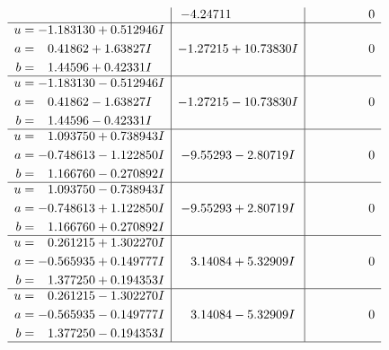 \documentclass[1p]{elsarticle_modified}
\theoremstyle{definition}
\begin{document}
$$\begin{array}{c|c|c}
 & -4.24711\phantom{ +0.000000I} & \phantom{-0.000000 } 0 \\ \hline\begin{aligned}
u &= -1.183130 + 0.512946 I \\
a &= \phantom{-}0.41862 + 1.63827 I \\
b &= \phantom{-}1.44596 + 0.42331 I\end{aligned}
 & -1.27215 + 10.73830 I & \phantom{-0.000000 } 0 \\ \hline\begin{aligned}
u &= -1.183130 - 0.512946 I \\
a &= \phantom{-}0.41862 - 1.63827 I \\
b &= \phantom{-}1.44596 - 0.42331 I\end{aligned}
 & -1.27215 - 10.73830 I & \phantom{-0.000000 } 0 \\ \hline\begin{aligned}
u &= \phantom{-}1.093750 + 0.738943 I \\
a &= -0.748613 - 1.122850 I \\
b &= \phantom{-}1.166760 - 0.270892 I\end{aligned}
 & -9.55293 - 2.80719 I & \phantom{-0.000000 } 0 \\ \hline\begin{aligned}
u &= \phantom{-}1.093750 - 0.738943 I \\
a &= -0.748613 + 1.122850 I \\
b &= \phantom{-}1.166760 + 0.270892 I\end{aligned}
 & -9.55293 + 2.80719 I & \phantom{-0.000000 } 0 \\ \hline\begin{aligned}
u &= \phantom{-}0.261215 + 1.302270 I \\
a &= -0.565935 + 0.149777 I \\
b &= \phantom{-}1.377250 + 0.194353 I\end{aligned}
 & \phantom{-}3.14084 + 5.32909 I & \phantom{-0.000000 } 0 \\ \hline\begin{aligned}
u &= \phantom{-}0.261215 - 1.302270 I \\
a &= -0.565935 - 0.149777 I \\
b &= \phantom{-}1.377250 - 0.194353 I\end{aligned}
 & \phantom{-}3.14084 - 5.32909 I & \phantom{-0.000000 } 0\\
 \hline 
 \end{array}$$\newpage$$\begin{array}{c|c|c}  

\end{array}$$
\end{document}
